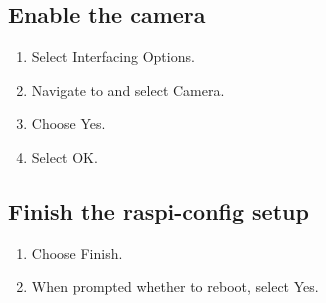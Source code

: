 \subsection{Enable the camera}
\begin{enumerate}
	\item Select Interfacing Options.
	\item Navigate to and select Camera.
	\item Choose Yes.
	\item Select OK.
\end{enumerate}

\subsection{Finish the raspi-config setup}
\begin{enumerate}
	\item Choose Finish.
	\item When prompted whether to reboot, select Yes.
\end{enumerate}


	


